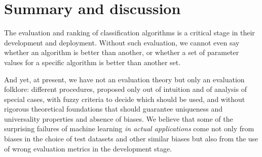 \documentclass[\ifafour a4paper,12pt,\else a5paper,10pt,\fi%
onecolumn,oneside,article,%
british%
]{memoir}
\theoremstyle{remark}
\theoremstyle{innote}
\renewcommand*{\|}[1][]{\nonscript\:#1\vert\nonscript\:\mathopen{}}
\newcommand*{\eg}{{e.g.}}
\begin{document}
%




\section{Summary and discussion}
\label{sec:discussion}

The evaluation and ranking of classification algorithms is a critical stage in their development and deployment. Without such evaluation, we cannot even say whether an algorithm is better than another, or whether a set of parameter values for a specific algorithm is better than another set.

And yet, at present, we have not an evaluation theory but only an evaluation folklore: different procedures, proposed only out of intuition and of analysis of special cases, with fuzzy criteria to decide which should be used, and without rigorous theoretical foundations that should guarantee uniqueness and universality properties and absence of biases. We believe that some of the surprising failures of machine learning \emph{in actual applications}\autocites[see \eg][]{varoquauxetal2022} come not only from biases in the choice of test datasets and other similar biases but also from the use of wrong evaluation metrics in the development stage.
\end{document}
